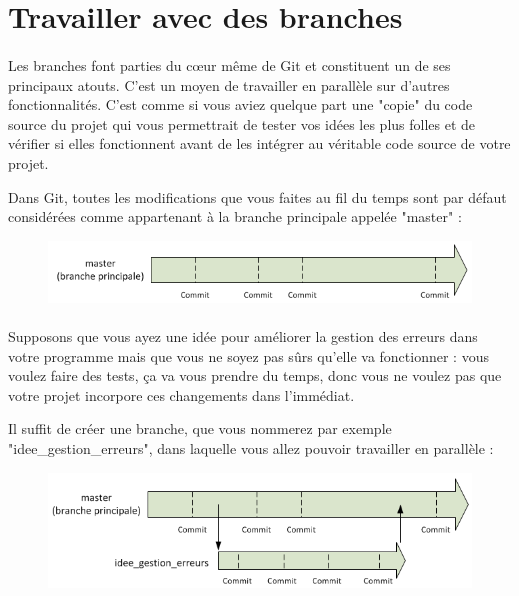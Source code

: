 \documentclass[french, a4paper, 12pt, titlepage]{article}
\begin{document}
\section{Travailler avec des branches}
\paragraph{}Les branches font parties du cœur même de Git et constituent un de ses principaux atouts. C’est un moyen de travailler en parallèle sur d’autres fonctionnalités. C’est comme si vous aviez quelque part une "copie" du code source du projet qui vous permettrait de tester vos idées les plus folles et de vérifier si elles fonctionnent avant de les intégrer au véritable code source de votre projet.

Dans Git, toutes les modifications que vous faites au fil du temps sont par défaut considérées comme appartenant à la branche principale appelée "master" :

\begin{figure}[h]
\includegraphics[width=\textwidth]{Branch1}
\end{figure}

\paragraph{}Supposons que vous ayez une idée pour améliorer la gestion des erreurs dans votre programme mais que vous ne soyez pas sûrs qu’elle va fonctionner : vous voulez faire des tests, ça va vous prendre du temps, donc vous ne voulez pas que votre projet incorpore ces changements dans l’immédiat.

Il suffit de créer une branche, que vous nommerez par exemple "idee\_gestion\_erreurs", dans laquelle vous allez pouvoir travailler en parallèle :

\begin{figure}[h]
\includegraphics[width=\textwidth]{Branch2}
\end{figure}
\end{document}
